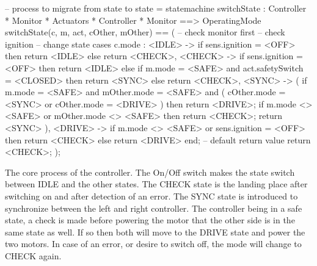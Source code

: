 \begin{vdm_al}
  -- process to migrate from state to state = statemachine
  switchState : Controller * Monitor * Actuators *
    Controller * Monitor ==> OperatingMode
  switchState(c, m, act, cOther, mOther) == (
      -- check monitor first
      -- check ignition
      -- change state
      cases c.mode :
        <IDLE> ->  if sens.ignition = <OFF>
                   then return <IDLE>
                   else return <CHECK>,
        <CHECK> -> if sens.ignition = <OFF>
                   then return <IDLE>
                   else if m.mode = <SAFE> and
                           act.safetySwitch = <CLOSED>
                        then return <SYNC>
                        else return <CHECK>,
        <SYNC> -> ( if m.mode = <SAFE> and
                       mOther.mode = <SAFE> and
                       ( cOther.mode = <SYNC> or
                         cOther.mode = <DRIVE> )
                    then return <DRIVE>;
                    if m.mode <> <SAFE> or
                       mOther.mode <> <SAFE>
                    then return <CHECK>;
                    return <SYNC> ),
        <DRIVE> -> if m.mode <> <SAFE> or
                      sens.ignition = <OFF>
                   then return <CHECK>
                   else return <DRIVE>
      end;
      -- default return value
      return <CHECK>;
    );
\end{vdm_al}

The core process of the controller. The On/Off switch makes the state
switch between \textsf{IDLE} and the other states.  The \textsf{CHECK}
state is the landing place after switching on and after detection of
an error. The \textsf{SYNC} state is introduced to synchronize between
the left and right controller. The controller being in a safe state, a
check is made before powering the motor that the other side is in the
same state as well. If so then both will move to the \textsf{DRIVE}
state and power the two motors. In case of an error, or desire to
switch off, the mode will change to \textsf{CHECK} again.

